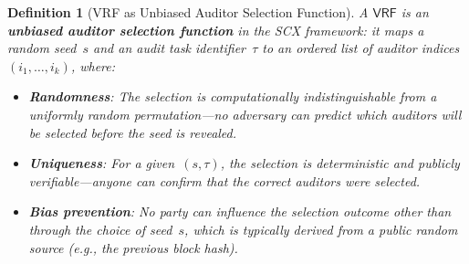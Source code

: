 \documentclass[12pt,a4paper]{article}
\newtheorem{definition}[theorem]{Definition}
\theoremstyle{remark}
\newcommand{\SCX}{\textsf{SCX}}
\newcommand{\VRF}{\textsf{VRF}}
\begin{document}
\begin{definition}[VRF as Unbiased Auditor Selection Function]
\label{def:vrf_auditor}
A $\VRF$ is an \textbf{unbiased auditor selection function} in the \SCX{} framework: it maps a random seed~$s$ and an audit task identifier~$\tau$ to an ordered list of auditor indices~$(i_1, \ldots, i_k)$, where:
\begin{itemize}[leftmargin=*]
  \item \textbf{Randomness}: The selection is computationally indistinguishable from a uniformly random permutation---no adversary can predict which auditors will be selected before the seed is revealed.
  \item \textbf{Uniqueness}: For a given~$(s, \tau)$, the selection is deterministic and publicly verifiable---anyone can confirm that the correct auditors were selected.
  \item \textbf{Bias prevention}: No party can influence the selection outcome other than through the choice of seed~$s$, which is typically derived from a public random source (e.g., the previous block hash).
\end{itemize}
\end{definition}
\end{document}
